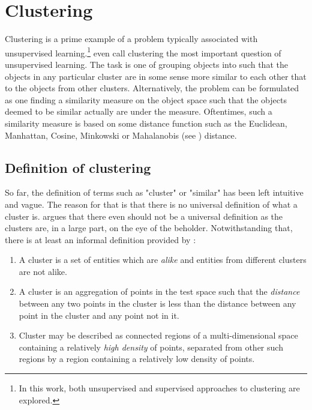 \chapter{Clustering}

Clustering is a prime example of a problem typically associated with unsupervised learning.\footnote{In this work, both unsupervised and supervised approaches to clustering are explored.} \cite{xu_comprehensive_2015} even call clustering the most important question of unsupervised learning. The task is one of grouping objects into  such that the objects in any particular cluster are in some sense more similar to each other that to the objects from other clusters. Alternatively, the problem can be formulated as one finding a similarity measure on the object space such that the objects deemed to be similar actually are under the measure. Oftentimes, such a similarity measure is based on some distance function such as the Euclidean, Manhattan, Cosine, Minkowski or Mahalanobis (see \cite{mahalanobis_generalised_1936}) distance.

\section{Definition of clustering}
So far, the definition of terms such as "cluster" or "similar" has been left intuitive and vague. The reason for that is that there is no universal definition of what a cluster is. \cite{estivill-castro_why_2002} argues that there even should not be a universal definition as the clusters are, in a large part, on the eye of the beholder. Notwithstanding that, there is at least an informal definition provided by \cite{jain_algorithms_1988}:

\begin{enumerate}
	\item A cluster is a set of entities which are \textit{alike} and entities from different clusters are not alike.
	\item A cluster is an aggregation of points in the test space such that the \textit{distance} between any two points in the cluster is less than the distance between any point in the cluster and any point not in it.
	\item Cluster may be described as connected regions of a multi-dimensional space containing a relatively \textit{high density} of points, separated from other such regions by a region containing a relatively low density of points.
\end{enumerate}

